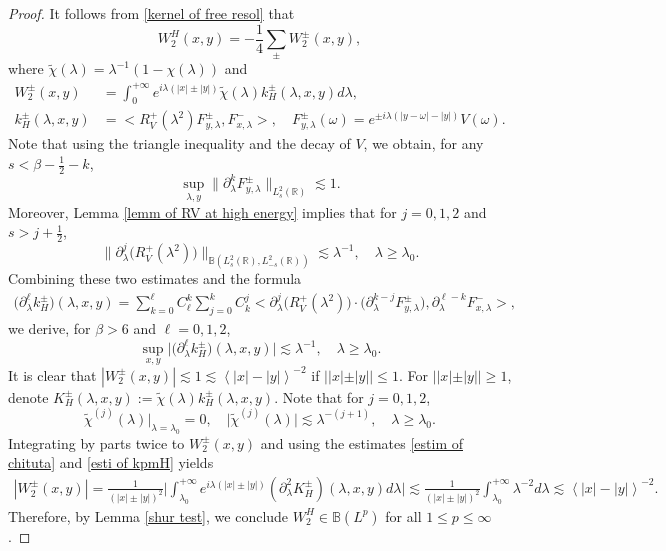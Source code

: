 \documentclass[reqno]{amsart}
\newcommand\R{\mathbb{R}}
\newcommand\B{\mathbb{B}}
\numberwithin{equation}{section}
\begin{document}
\begin{proof}
It follows from \eqref{kernel of free resol} that
\begin{equation*}
    W^{H}_{2}(x,y)=-\frac{1}{4}\sum\limits_{\pm}W^{\pm}_2(x,y),
\end{equation*}
where $\widetilde{\chi}(\lambda)=\lambda^{-1}(1-\chi(\lambda))$ and 
\begin{align*}
W^{\pm}_2(x,y)&=\int_{0}^{+\infty}e^{i\lambda(|x|\pm|y|)}\widetilde{\chi}(\lambda)k^{\pm}_{H}(\lambda,x,y)d\lambda,\\
k^{\pm}_{H}(\lambda,x,y)&=\big<R^+_V(\lambda^2)F^{\pm}_{y,\lambda}, F^-_{x,\lambda}\big>,
\quad F^{\pm}_{y,\lambda}(\omega)=e^{\pm i\lambda(|y-\omega|-|y|)}V(\omega).
\end{align*}
Note that using the triangle inequality and the decay of $V$, we obtain, for any $s<\beta-\frac{1}{2}-k$,
\begin{equation*}
\sup\limits_{\lambda,y}\big\|\partial^k_{\lambda}F^{\pm}_{y,\lambda}\big\|_{L^2_s(\R)}\lesssim1.
\end{equation*}
Moreover, Lemma \ref{lemm of RV at high energy} implies that for $j=0,1,2$ and $s>j+\frac{1}{2}$,
\begin{equation*}
\|\partial^{j}_{\lambda}\big(R^+_V(\lambda^2)\big)\|_{\B(L^2_s(\R),L^2_{-s}(\R))} \lesssim \lambda^{-1},\quad \lambda\geq\lambda_0.
\end{equation*}
Combining these two estimates and the formula
\begin{align*}
\big(\partial^{\ell}_{\lambda}k^{\pm}_{H}\big)(\lambda,x,y)=\sum\limits_{k=0}^{\ell}C^k_{\ell}\sum\limits_{j=0}^{k}C^j_k\big<\partial^j_{\lambda}\big(R^+_V(\lambda^2)\big)\cdot\big(\partial^{k-j}_{\lambda}F^{\pm}_{y,\lambda}\big),\partial^{\ell-k}_{\lambda}F^{-}_{x,\lambda}\big>, 
\end{align*}
we derive, for $\beta>6$ and $\ell=0,1,2$,
\begin{equation}\label{esti of kpmH}
\sup\limits_{x,y}\big|\big(\partial^{\ell}_{\lambda}k^{\pm}_{H}\big)(\lambda,x,y)\big|\lesssim\lambda^{-1},\quad \lambda\geq\lambda_0.
\end{equation}
It is clear that $|W^{\pm}_2(x,y)|\lesssim1\lesssim\left<|x|-|y|\right>^{-2}$ if $||x|\pm|y||\leq1$. For $||x|\pm|y||\geq1$, denote $K^{\pm}_{H}(\lambda,x,y):=\widetilde{\chi}(\lambda)k^{\pm}_{H}(\lambda,x,y).$ Note that for $j=0,1,2$, 
\begin{equation}\label{estim of chituta}
\widetilde{\chi}^{(j)}(\lambda)\big|_{\lambda=\lambda_0}=0,\quad \big|\widetilde{\chi}^{(j)}(\lambda)\big|\lesssim\lambda^{-(j+1)},\quad \lambda\geq\lambda_0. 
\end{equation}
Integrating by parts twice to $W^{\pm}_2(x,y)$ and using the estimates \eqref{estim of chituta} and \eqref{esti of kpmH} yields
\begin{align*}
|W^{\pm}_2(x,y)|=\frac{1}{(|x|\pm|y|)^2}\Big|\int_{\lambda_0}^{+\infty}e^{i\lambda(|x|\pm|y|)}(\partial^2_{\lambda}K^{\pm}_{H})(\lambda,x,y)d\lambda\Big|\lesssim\frac{1}{(|x|\pm|y|)^2}\int_{\lambda_0}^{+\infty}\lambda^{-2}d\lambda\lesssim\left<|x|-|y|\right>^{-2}.   
\end{align*}
Therefore, by Lemma \ref{shur test}, we conclude $W^{H}_2\in\B(L^p)$ for all $1\leq p\leq \infty$.
\end{proof}
\end{document}
